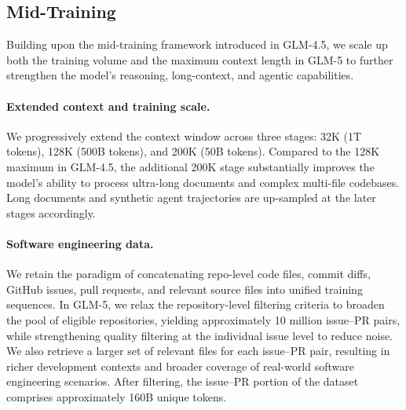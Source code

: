 \documentclass{article}
\theoremstyle{definition}
\begin{document}
\subsection{Mid-Training}

Building upon the mid-training framework introduced in GLM-4.5, we scale up both the training volume and the maximum context length in GLM-5 to further strengthen the model's reasoning, long-context, and agentic capabilities.

\paragraph{Extended context and training scale.} We progressively extend the context window across three stages: 32K (1T tokens), 128K (500B tokens), and 200K (50B tokens). Compared to the 128K maximum in GLM-4.5, the additional 200K stage substantially improves the model's ability to process ultra-long documents and complex multi-file codebases. Long documents and synthetic agent trajectories are up-sampled at the later stages accordingly.

\paragraph{Software engineering data.} We retain the paradigm of concatenating repo-level code files, commit diffs, GitHub issues, pull requests, and relevant source files into unified training sequences. In GLM-5, we relax the repository-level filtering criteria to broaden the pool of eligible repositories, yielding approximately 10 million issue–PR pairs, while strengthening quality filtering at the individual issue level to reduce noise. We also retrieve a larger set of relevant files for each issue–PR pair, resulting in richer development contexts and broader coverage of real-world software engineering scenarios. After filtering, the issue–PR portion of the dataset comprises approximately 160B unique tokens.
\end{document}
